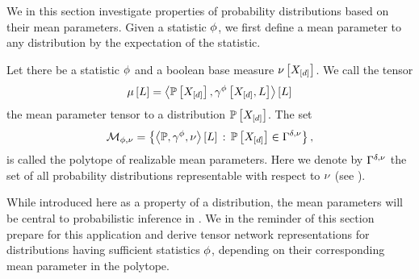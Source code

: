 
We in this section investigate properties of probability distributions based on their mean parameters.
Given a statistic $\phi$, we first define a mean parameter to any distribution by the expectation of the statistic.

\begin{definition}
    \label{def:meanPolytope}
    Let there be a statistic $\phi$ and a boolean base measure $\nu\left[X_{[d]}\right]$.
    We call the tensor
    \begin{align*}
        \mu\left[L\right]
        = \left\langle \mathbb{P}\left[X_{[d]}\right],\gamma^{\phi}\left[X_{[d]},L\right]\right\rangle \left[ L \right]
    \end{align*}
    the mean parameter tensor to a distribution $\mathbb{P}\left[X_{[d]}\right]$.
    The set
    \begin{align*}
        \mathcal{M}_{\phi,\nu}
        = \left\{\left\langle \mathbb{P},\gamma^{\phi},\nu\right\rangle \left[ L \right]\,:\,\mathbb{P}\left[X_{[d]}\right]\in\Gamma^{\delta,\nu} \right\},
    \end{align*}
    is called the polytope of realizable mean parameters.
    Here we denote by $\Gamma^{\delta,\nu}$ the set of all probability distributions representable with respect to $\nu$ (see ).
\end{definition}

While introduced here as a property of a distribution, the mean parameters will be central to probabilistic inference in .
We in the reminder of this section prepare for this application and derive tensor network representations for distributions having sufficient statistics $\phi$, depending on their corresponding mean parameter in the polytope.



